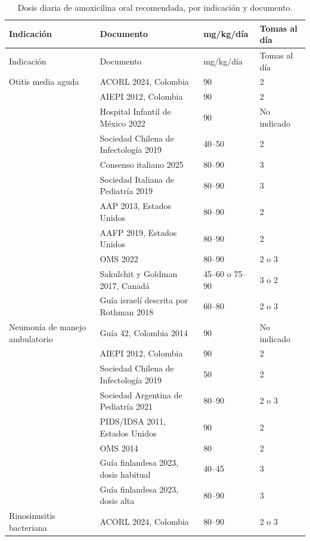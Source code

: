 \documentclass[10pt,a4paper]{article}
\begin{document}
{\small
\begin{longtable}{@{}L{3.0cm}L{6.1cm}L{3.6cm}L{2.4cm}@{}}
\caption{Dosis diaria de amoxicilina oral recomendada, por indicación y documento.}\\
\toprule
Indicación & Documento & mg/kg/día & Tomas al día \\
\midrule
\endfirsthead
\toprule
Indicación & Documento & mg/kg/día & Tomas al día \\
\midrule
\endhead
\bottomrule
\endfoot
Otitis media aguda & ACORL 2024, Colombia~\citep{acorloma2024} & 90 & 2 \\
& AIEPI 2012, Colombia~\citep{aiepi2012} & 90 & 2 \\
& Hospital Infantil de México 2022~\citep{mexicooma2022} & 90 & No indicado \\
& Sociedad Chilena de Infectología 2019~\citep{chileoma2019} & 40--50 & 2 \\
& Consenso italiano 2025~\citep{castelli2025} & 80--90 & 3 \\
& Sociedad Italiana de Pediatría 2019~\citep{marchisio2019} & 80--90 & 3 \\
& AAP 2013, Estados Unidos~\citep{lieberthal2013} & 80--90 & 2 \\
& AAFP 2019, Estados Unidos~\citep{gaddey2019} & 80--90 & 2 \\
& OMS 2022~\citep{aware2022} & 80--90 & 2 o 3 \\
& Sakulchit y Goldman 2017, Canadá~\citep{sakulchit2017} & 45--60 o 75--90 & 3 o 2 \\
& Guía israelí descrita por Rothman 2018~\citep{rothman2018} & 60--80 & 2 o 3 \\
\midrule
Neumonía de manejo ambulatorio & Guía 42, Colombia 2014~\citep{gpc42} & 90 & No indicado \\
& AIEPI 2012, Colombia~\citep{aiepi2012} & 90 & 2 \\
& Sociedad Chilena de Infectología 2019~\citep{chilenac2019} & 50 & 2 \\
& Sociedad Argentina de Pediatría 2021~\citep{sapiras2021} & 80--90 & 2 o 3 \\
& PIDS/IDSA 2011, Estados Unidos~\citep{bradley2011} & 90 & 2 \\
& OMS 2014~\citep{who2014} & 80 & 2 \\
& Guía finlandesa 2023, dosis habitual~\citep{backman2025} & 40--45 & 3 \\
& Guía finlandesa 2023, dosis alta~\citep{backman2025} & 80--90 & 3 \\
\midrule
Rinosinusitis bacteriana & ACORL 2024, Colombia~\citep{acorlrs2024} & 80--90 & 2 o 3 \\

\end{longtable}}
\end{document}

